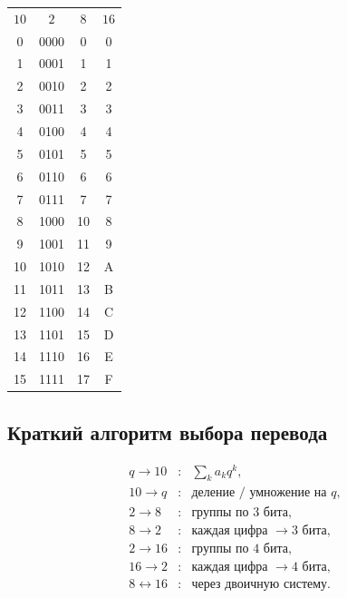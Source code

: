 \documentclass[../final.tex]{subfiles}
\begin{document}
\begin{center}

\renewcommand{\arraystretch}{1.25}

\begin{tabular}{cccc}
\textcolor{rc3}{\bfseries $10$}
&
\textcolor{rc3}{\bfseries $2$}
&
\textcolor{rc3}{\bfseries $8$}
&
\textcolor{rc3}{\bfseries $16$}
\\[2mm]

0  & 0000 & 0  & 0 \\
1  & 0001 & 1  & 1 \\
2  & 0010 & 2  & 2 \\
3  & 0011 & 3  & 3 \\
4  & 0100 & 4  & 4 \\
5  & 0101 & 5  & 5 \\
6  & 0110 & 6  & 6 \\
7  & 0111 & 7  & 7 \\
8  & 1000 & 10 & 8 \\
9  & 1001 & 11 & 9 \\
10 & 1010 & 12 & A \\
11 & 1011 & 13 & B \\
12 & 1100 & 14 & C \\
13 & 1101 & 15 & D \\
14 & 1110 & 16 & E \\
15 & 1111 & 17 & F

\end{tabular}

\end{center}



\subsection{Краткий алгоритм выбора перевода}

\[
\begin{array}{ccl}
q\rightarrow10
&:&
\displaystyle
\sum_k a_kq^k,
\\[3mm]

10\rightarrow q
&:&
\text{деление / умножение на }q,
\\[3mm]

2\rightarrow8
&:&
\text{группы по }3\text{ бита},
\\[2mm]

8\rightarrow2
&:&
\text{каждая цифра }\rightarrow3\text{ бита},
\\[2mm]

2\rightarrow16
&:&
\text{группы по }4\text{ бита},
\\[2mm]

16\rightarrow2
&:&
\text{каждая цифра }\rightarrow4\text{ бита},
\\[2mm]

8\leftrightarrow16
&:&
\text{через двоичную систему}.
\end{array}
\]
\end{document}
